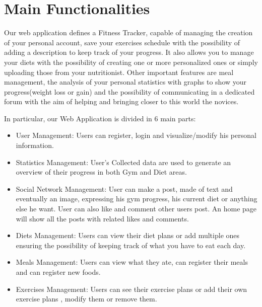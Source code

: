 \section{Main Functionalities}

Our web application defines a Fitness Tracker, capable of managing the creation of your personal account, save your exercises schedule with the possibility of adding a description to keep track of your progress.
It also allows you to manage your diets with the possibility of creating one or more personalized ones or simply uploading those from your nutritionist.
Other important features are meal management, the analysis of your personal statistics with graphs to show your progress(weight loss or gain) and the possibility of communicating in a dedicated forum with the aim of helping and bringing closer to this world the novices.








In particular, our Web Application is divided in 6 main parts:
\begin{itemize}
    \item User Management: Users can register, login and visualize/modify his personal information. 
    \item Statistics Management: User's Collected data are used to generate an overview of their progress in both Gym and Diet areas. 
    \item Social Network Management: User can make a post, made of text and eventually an image, expressing his gym progress, his current diet or anything else he want. User can also like and comment other users post. An home page will show all the posts with related likes and comments. 
    \item Diets Management: Users can view their diet plans or add multiple ones ensuring the possibility of keeping track of what you have to eat each day.
    \item Meals Management: Users can view what they ate, can register their meals and can register new foods.
    \item Exercises Management: Users can see their exercise plans or add their own exercise plans , modify them or remove them.
    
   
\end{itemize}